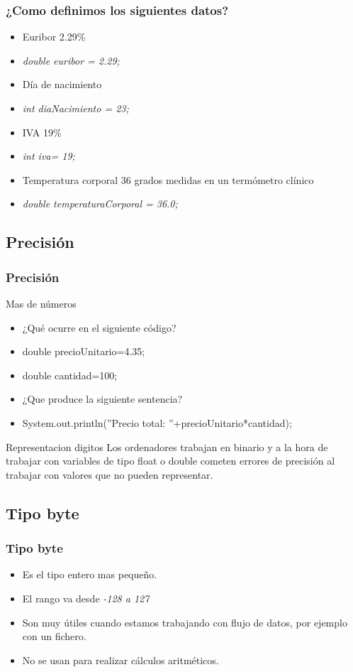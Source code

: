 \documentclass{beamer}
\begin{document}
\begin{frame}
\frametitle{¿Como definimos los siguientes datos?}
\begin{itemize}[<+->]
\item Euribor 2.29\%
\item \emph{double euribor = 2.29;} 
\item Día de nacimiento
\item \emph{int diaNacimiento = 23;}
\item IVA 19\%
\item \emph{int iva= 19;}
\item Temperatura corporal 36 grados medidas en un termómetro clínico
\item \emph{double temperaturaCorporal = 36.0;}
\end{itemize}
\pause

\end{frame}

\subsection{Precisión}
\begin{frame}
\frametitle{Precisión}
\begin{block}{Mas de números}
\begin{itemize}[<+-| alert@+>]
\item¿Qué ocurre en el siguiente código? 
\item double precioUnitario=4.35;
\item double cantidad=100;
\item ¿Que produce la siguiente sentencia?
\item System.out.println(''Precio total: ''+precioUnitario*cantidad);
\end{itemize}
\end{block}
\pause
\begin{block}{Representacion digitos}
Los ordenadores trabajan en binario y a la hora de trabajar con variables de tipo float o double cometen errores de precisión al trabajar con valores que no pueden representar.
\end{block}
\pause

\end{frame}

\subsection{Tipo byte}
\begin{frame}
\frametitle{Tipo byte}
\begin{itemize}[<+-| alert@+>]
\item Es el tipo entero mas pequeño.
\item El rango va desde \emph{-128 a 127}
\item Son muy útiles cuando estamos trabajando con flujo de datos, por ejemplo con un fichero.
\item No se usan para realizar cálculos aritméticos.
\end{itemize}
\pause
\end{frame}
\end{document}
